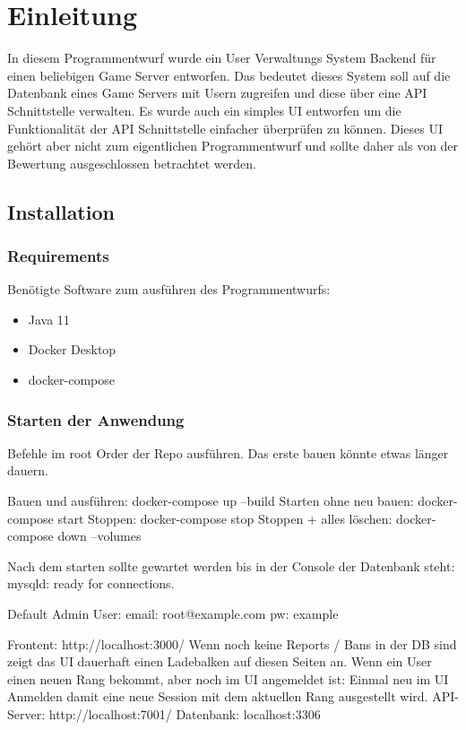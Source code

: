 \chapter{Einleitung}

In diesem Programmentwurf wurde ein User Verwaltungs System Backend für einen beliebigen Game Server entworfen.
Das bedeutet dieses System soll auf die Datenbank eines Game Servers mit Usern zugreifen und diese über eine API Schnittstelle verwalten.
Es wurde auch ein simples UI entworfen um die Funktionalität der API Schnittstelle einfacher überprüfen zu können.
Dieses UI gehört aber nicht zum eigentlichen Programmentwurf und sollte daher als von der Bewertung ausgeschlossen betrachtet werden.

\section{Installation}

\subsection{Requirements}

Benötigte Software zum ausführen des Programmentwurfs:

\begin{itemize}
    \item Java 11
    \item Docker Desktop
    \item docker-compose
\end{itemize}

\subsection{Starten der Anwendung}
Befehle im root Order der Repo ausführen.
Das erste bauen könnte etwas länger dauern.

Bauen und ausführen: docker-compose up --build
\newline
Starten ohne neu bauen: docker-compose start
\newline
Stoppen: docker-compose stop
\newline
Stoppen + alles löschen: docker-compose down --volumes
\newline

Nach dem starten sollte gewartet werden bis in der Console der Datenbank steht: mysqld: ready for connections.



Default Admin User: email: root@example.com pw: example




Frontent: http://localhost:3000/
Wenn noch keine Reports / Bans in der DB sind zeigt das UI dauerhaft einen Ladebalken auf diesen Seiten an.
Wenn ein User einen neuen Rang bekommt, aber noch im UI angemeldet ist: Einmal neu im UI Anmelden damit eine neue Session mit dem aktuellen Rang ausgestellt wird.
\newline
API-Server: http://localhost:7001/
\newline
Datenbank: localhost:3306